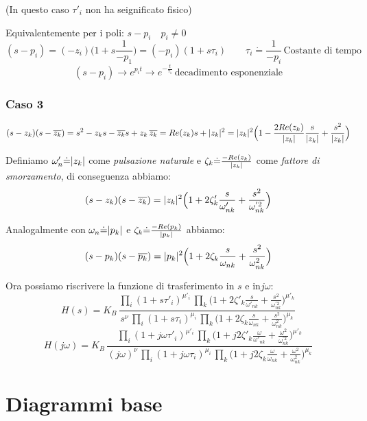  (In questo caso $ \tau'_i $ non ha seignificato fisico) %
 
 Equivalentemente per i poli: $ s-p_i \quad p_i \ne 0 $
 \[ 
 (s-p_i)=(-z_i)\Big(1+s \frac{1}{-p_1} \Big)=(-p_i)(1+s \tau_i) \qquad \tau_i \dot{=} \frac{1}{-p_i} \, \text{Costante di tempo}
 \]
 \[ (s-p_i) \rightarrow e^{p_i t} \rightarrow e^{-\frac{t}{\tau_1}} \, \text{decadimento esponenziale}\]
 
 \subsubsection{Caso 3}
 
 \[ 
 	(s-z_k)(s-\overline{z_k}) = s^2-z_ks-\overline{z_k}s+z_k \,\overline{z_k} = Re(z_k) s+\lvert z_k\rvert^2 = \lvert z_k\rvert^2\Big(1-\frac{2 Re(z_k)}{\lvert z_k\rvert}\frac{s}{\lvert z_k\rvert}+\frac{s^2}{\lvert z_k\rvert} \Big)
 \]

 Definiamo $ \omega'_n \dot{=} \lvert z_k\rvert $ come \emph{pulsazione naturale} e $ \zeta_k \dot{=} \frac{-Re(z_k)}{\lvert z_k\rvert} $ come \emph{fattore di smorzamento}, di conseguenza abbiamo: 
 \[ 
 	(s-z_k)(s-\overline{z_k}) = \lvert z_k\rvert^2\Big(1+2\zeta'_k\frac{s}{\omega'_{nk}}+\frac{s^2}{\omega^{'2}_{nk}} \Big)
  \]
  
  Analogalmente con $ \omega_n \dot{=} \lvert p_k\rvert $ e $ \zeta_k \dot{=} \frac{-Re(p_k)}{\lvert p_k\rvert} $ abbiamo:
   \[ 
  (s-p_k)(s-\overline{p_k}) = \lvert p_k\rvert^2\Big(1+2\zeta_k\frac{s}{\omega_{nk}}+\frac{s^2}{\omega^{2}_{nk}} \Big)
  \]
  
  Ora possiamo riscrivere la funzione di trasferimento in $ s $ e in$ j\omega $:
  \[ 
  	H(s) = K_B \, \frac{\prod_i (1+s\tau'_i)^{\mu'_i}\,  \prod_k \Big(1+2\zeta'_k\frac{s}{\omega'_{nk}}+\frac{s^2}{\omega^{'2}_{nk}} \Big)^{\mu'_k}}{s^\nu\, \prod_i (1+s\tau_i)^{\mu_i}\,  \prod_k \Big(1+2\zeta_k\frac{s}{\omega_{nk}}+\frac{s^2}{\omega^{2}_{nk}} \Big)^{\mu_k} }
   \]
     \[ 
   H(j\omega) = K_B \, \frac{\prod_i (1+j\omega\tau'_i)^{\mu'_i}\,  \prod_k \Big(1+j2\zeta'_k\frac{\omega}{\omega'_{nk}}+\frac{\omega^2}{\omega^{'2}_{nk}} \Big)^{\mu'_k}}{(j\omega)^\nu\, \prod_i (1+j\omega\tau_i)^{\mu_i}\,  \prod_k \Big(1+j2\zeta_k\frac{\omega}{\omega_{nk}}+\frac{\omega^2}{\omega^{2}_{nk}} \Big)^{\mu_k} }
   \]
  
\section{Diagrammi base}
   
